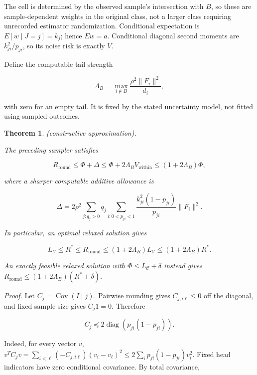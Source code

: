 \documentclass[11pt]{article}
\newtheorem{theorem}{Theorem}
\begin{document}
The cell is determined by the observed sample's intersection with \(B\),
so these are sample-dependent weights in the original class, not a
larger class requiring unrecorded estimator randomization. Conditional
expectation is \(E[w\mid J=j]=k_j\); hence \(Ew=a\). Conditional
diagonal second moments are \(k_{ji}^2/p_{ji}\), so its noise risk is
exactly \(V\).

Define the computable tail strength

\[
\Lambda_B=\max_{i\notin B}\frac{\rho^2\|F_i\|^2}{d_i},
\]

with zero for an empty tail. It is fixed by the stated uncertainty
model, not fitted using sampled outcomes.

\begin{theorem}\label{th:9} (constructive approximation).

The preceding sampler satisfies

\begin{equation}\label{eq:38}
R_{\mathrm{round}}\le\Phi+\Delta\le\Phi+2\Lambda_B V_{\mathrm{within}}
\le(1+2\Lambda_B)\Phi, 
\end{equation}

where a sharper computable additive allowance is

\begin{equation}\label{eq:39}
\Delta=2\rho^2\sum_{j:q_j>0}q_j\sum_{i:0<p_{ji}<1}
\frac{k_{ji}^2(1-p_{ji})}{p_{ji}}\|F_i\|^2. 
\end{equation}

In particular, an optimal relaxed solution gives

\begin{equation}\label{eq:40}
L_{\mathcal C}\le R^*\le R_{\mathrm{round}}
\le(1+2\Lambda_B)L_{\mathcal C}\le(1+2\Lambda_B)R^*. 
\end{equation}

An exactly feasible relaxed solution with
\(\Phi\le L_{\mathcal C}+\delta\) instead gives
\(R_{\mathrm{round}}\le(1+2\Lambda_B)(R^*+\delta)\).

\end{theorem}

\emph{Proof.} Let \(C_j=\operatorname{Cov}(I\mid j)\). Pairwise rounding
gives \(C_{j,i\ell}\le0\) off the diagonal, and fixed sample size gives
\(C_j1=0\). Therefore

\[
C_j\preceq2\operatorname{diag}(p_{ji}(1-p_{ji})).
\]

Indeed, for every vector \(v\),
\(v^TC_jv=\sum_{i<\ell}(-C_{j,i\ell})(v_i-v_\ell)^2\le2\sum_i p_{ji}(1-p_{ji})v_i^2\).
Fixed head indicators have zero conditional covariance. By total
covariance,
\end{document}
